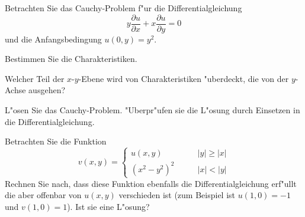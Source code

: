 Betrachten Sie das Cauchy-Problem f"ur die Differentialgleichung
\[
y\frac{\partial u}{\partial x}+x\frac{\partial u}{\partial y}=0
\]
und die Anfangsbedingung $u(0,y)=y^2$.
\begin{teilaufgaben}
\item Bestimmen Sie die Charakteristiken.
\item Welcher Teil der $x$-$y$-Ebene wird von Charakteristiken "uberdeckt,
die von der $y$-Achse ausgehen?
\item L"osen Sie das Cauchy-Problem. "Uberpr"ufen sie die L"osung durch
Einsetzen in die Differentialgleichung.
\item Betrachten Sie die Funktion
\[
v(x,y)=\begin{cases}
u(x,y)&\qquad |y|\ge |x|\\
(x^2-y^2)^2&\qquad |x|<|y|
\end{cases}
\]
Rechnen Sie nach, dass diese Funktion ebenfalls die Differentialgleichung
erf"ullt
die aber offenbar von $u(x,y)$ verschieden ist (zum Beispiel ist
$u(1,0)=-1$ und $v(1,0)=1$). Ist sie eine L"osung?
\end{teilaufgaben}

